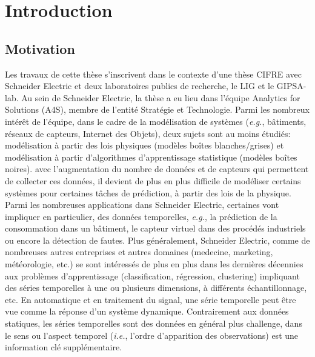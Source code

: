 \chapter*{Introduction}

\section*{Motivation}
Les travaux de cette thèse s'inscrivent dans le contexte d'une thèse CIFRE avec Schneider Electric et deux laboratoires publics de recherche, le LIG et le GIPSA-lab. Au sein de Schneider Electric, la thèse a eu lieu dans l'équipe Analytics for Solutions (A4S), membre de l'entité Stratégie et Technologie. Parmi les nombreux intérêt de l'équipe, dans le cadre de la modélisation de systèmes (\textit{e.g.}, bâtiments, réseaux de capteurs, Internet des Objets), deux sujets sont au moins étudiés: modélisation à partir des lois physiques (modèles boîtes blanches/grises) et modélisation à partir d'algorithmes d'apprentissage statistique (modèles boîtes noires). avec l'augmentation du nombre de données et de capteurs qui permettent de collecter ces données, il devient de plus en plus difficile de modéliser certains systèmes pour certaines tâches de prédiction, à partir des lois de la physique. Parmi les nombreuses applications dans Schneider Electric, certaines vont impliquer en particulier, des données temporelles, \textit{e.g.}, la prédiction de la consommation dans un bâtiment, le capteur virtuel dans des procédés industriels ou encore la détection de fautes. Plus généralement, Schneider Electric, comme de nombreuses autres entreprises et autres domaines (medecine, marketing, météorologie, etc.) se sont intéressés de plus en plus dans les dernières décennies aux problèmes d'apprentissage (classification, régression, clustering) impliquant des séries temporelles à une ou plusieurs dimensions, à différents échantillonnage, etc. En automatique et en traitement du signal, une série temporelle peut être vue comme la réponse d'un système dynamique. Contrairement aux données statiques, les séries temporelles sont des données en général plus challenge, dans le sens ou l'aspect temporel (\textit{i.e.}, l'ordre d'apparition des observations) est une information clé supplémentaire.


